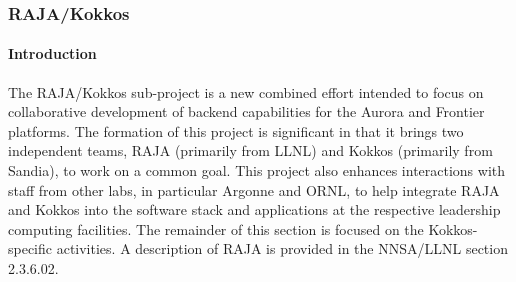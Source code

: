 %
%
%
%
\subsubsection{ RAJA/Kokkos} 

\paragraph{Introduction}
The RAJA/Kokkos sub-project is a new combined effort intended to focus on collaborative development of backend capabilities for the Aurora and Frontier platforms.  The formation of this project is significant in that it brings two independent teams, RAJA (primarily from LLNL) and Kokkos (primarily from Sandia), to work on a common goal. This project also enhances interactions with staff from other labs, in particular Argonne and ORNL, to help integrate RAJA and Kokkos into the software stack and applications at the respective leadership computing facilities.  The remainder of this section is focused on the Kokkos-specific activities. A description of RAJA is provided in the NNSA/LLNL section 2.3.6.02.


